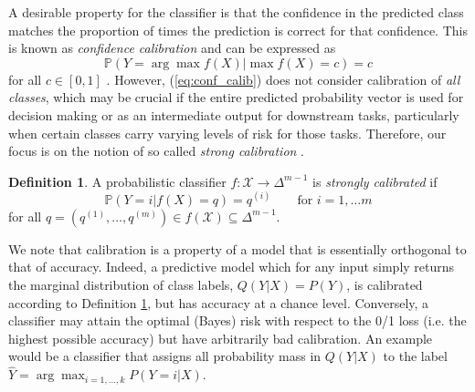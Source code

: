 \documentclass[twocolumn]{article}
\theoremstyle{definition}
\newtheorem{definition}[theorem]{Definition}
\begin{document}
A desirable property for the classifier is that the confidence in the predicted class matches the proportion of times the prediction is correct for that confidence. This is known as \emph{confidence calibration} and can be expressed as
\begin{equation} \label{eq:conf_calib}
    \mathbb{P}(Y = \arg \max f(X) | \max f(X) = c) = c
\end{equation}
for all $c \in [0,1]$ \citep{Guo_2017, vaicenavicius_2019}. However, (\ref{eq:conf_calib}) does not consider calibration of \emph{all classes}, which may be crucial if the entire predicted probability vector is used for decision making or as an intermediate output for downstream tasks, particularly when certain classes carry varying levels of risk for those tasks. Therefore, our focus is on the notion of so called \emph{strong calibration} \citep{Widmann_2019}.
\begin{definition} \label{def:calibration_class}
    A probabilistic classifier $f: \mathcal{X} \to \Delta^{m-1}$ is \emph{strongly calibrated} if 
    \begin{equation}
        \mathbb{P}(Y=i | f(X) = q) = q^{(i)} \qquad \text{for } i=1,\dots m
    \end{equation}
    for all $q = (q^{(1)}, \dots, q^{(m)}) \in f(\mathcal{X}) \subseteq \Delta^{m-1}$.
\end{definition}
We note that calibration is a property of a model that is essentially orthogonal to that of accuracy. Indeed, a predictive model which for any input simply returns the marginal distribution of class labels, $Q(Y|X)=P(Y)$, is calibrated according to Definition \ref{def:calibration_class}, but has accuracy at a chance level. Conversely, a classifier may attain the optimal (Bayes) risk with respect to the 0/1 loss (i.e. the highest possible accuracy) but have arbitrarily bad calibration. An example would be a classifier that assigns all probability mass in $Q(Y|X)$ to the label $\hat Y=\arg\max_{i=1,\ldots,k}P(Y=i|X)$.
\end{document}
